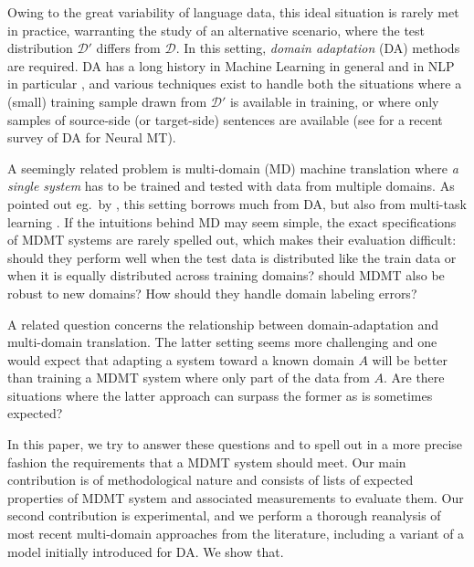 \documentclass[11pt]{article}
\newcommand{\fyTodo}[1]{\Todo[FY:]{\textcolor{orange}{#1}}}
\begin{document}
Owing to the great variability of language data, this ideal situation is rarely met in practice, warranting the study of an alternative scenario, where the test distribution $\mathcal{D'}$ differs from $\mathcal{D}$. In this setting, \emph{domain adaptation} (DA) methods are required. DA has a long history in Machine Learning in general \cite{Shimodaira00improving,Ben-David09atheory} and in NLP in particular \cite{Daume06domain,Blitzer07domain}, and various techniques exist to handle both the situations where a (small) training sample drawn from $\mathcal{D'}$ is available in training, or where only samples of source-side (or target-side) sentences are available (see \cite{Chu18asurvey} for a recent survey of DA for Neural MT).

A seemingly related problem is multi-domain (MD) machine translation \cite{Hassan17neural,Farajian17multidomain,Kobus17domaincontrol,Zeng18multidomain,Pham19generic} where \emph{a single system} has to be trained  and tested with data from multiple domains. As pointed out eg.\ by , this setting borrows much from DA, but also from multi-task learning \cite{Caruana97multitask}. If the intuitions behind MD may seem simple, the exact specifications of MDMT systems are rarely spelled out, which makes their evaluation difficult: should they perform well when the test data is distributed like the train data or when it is equally distributed across training domains? should MDMT also be robust to new domains? How should they handle domain labeling errors? 

A related question concerns the relationship between domain-adaptation and multi-domain translation. The latter setting seems more challenging and one would expect that adapting a system toward a known domain $A$ will be better than training a MDMT system where only part of the data from $A$. Are there situations where the latter approach can surpass the former as is sometimes expected?
 
In this paper, we try to answer these questions and to spell out in a more precise fashion the requirements that a MDMT system should meet. Our main contribution is of methodological nature and consists of lists of expected properties of MDMT system and associated measurements to evaluate them. Our second contribution is experimental, and we perform a thorough reanalysis of most recent multi-domain approaches from the literature, including a variant of a model initially introduced for DA. We show that\fyTodo{Spell out conclusions}.
 
\end{document}
